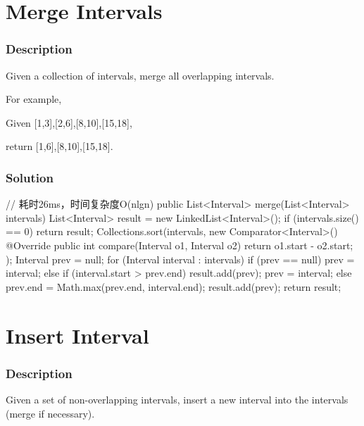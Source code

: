 \newpage

\section{Merge Intervals} %

\subsubsection{Description}
Given a collection of intervals, merge all overlapping intervals.

For example,

Given [1,3],[2,6],[8,10],[15,18],

return [1,6],[8,10],[15,18].

\subsubsection{Solution}

\begin{Code}
// 耗时26ms，时间复杂度O(nlgn)
public List<Interval> merge(List<Interval> intervals) {
    List<Interval> result = new LinkedList<Interval>();
    if (intervals.size() == 0) {
        return result;
    }
    Collections.sort(intervals, new Comparator<Interval>() {
        @Override
        public int compare(Interval o1, Interval o2) {
            return o1.start - o2.start;
        }
    });
    Interval prev = null;
    for (Interval interval : intervals) {
        if (prev == null) {
            prev = interval;
        } else {
            if (interval.start > prev.end) {
                result.add(prev);
                prev = interval;
            } else {
                prev.end = Math.max(prev.end, interval.end);
            }
        }
    }
    result.add(prev);
    return result;
}
\end{Code}

\newpage

\section{Insert Interval} %

\subsubsection{Description}
Given a set of non-overlapping intervals, insert a new interval into the intervals (merge if necessary).

